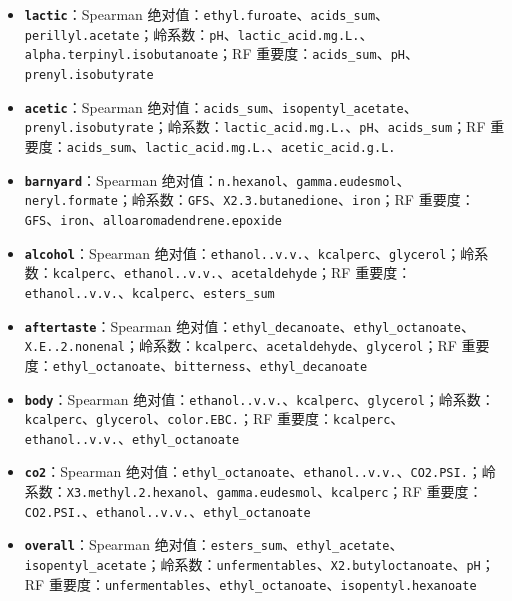\documentclass[
  11pt,
]{ctexart}
\newcounter{none} %
\begin{document}
\begin{itemize}
\item
  \textbf{\texttt{lactic}}：Spearman
  绝对值：\texttt{ethyl.furoate}、\texttt{acids\_sum}、\texttt{perillyl.\allowbreak{}acetate}；岭系数：\texttt{pH}、\texttt{lactic\_\allowbreak{}acid.\allowbreak{}mg.\allowbreak{}L.\allowbreak{}}、\texttt{alpha.\allowbreak{}terpinyl.\allowbreak{}isobutanoate}；RF
  重要度：\texttt{acids\_sum}、\texttt{pH}、\texttt{prenyl.\allowbreak{}isobutyrate}
\item
  \textbf{\texttt{acetic}}：Spearman
  绝对值：\texttt{acids\_sum}、\texttt{isopentyl\_\allowbreak{}acetate}、\texttt{prenyl.\allowbreak{}isobutyrate}；岭系数：\texttt{lactic\_\allowbreak{}acid.\allowbreak{}mg.\allowbreak{}L.\allowbreak{}}、\texttt{pH}、\texttt{acids\_sum}；RF
  重要度：\texttt{acids\_sum}、\texttt{lactic\_\allowbreak{}acid.\allowbreak{}mg.\allowbreak{}L.\allowbreak{}}、\texttt{acetic\_\allowbreak{}acid.\allowbreak{}g.\allowbreak{}L.\allowbreak{}}
\item
  \textbf{\texttt{barnyard}}：Spearman
  绝对值：\texttt{n.hexanol}、\texttt{gamma.\allowbreak{}eudesmol}、\texttt{neryl.formate}；岭系数：\texttt{GFS}、\texttt{X2.\allowbreak{}3.\allowbreak{}butanedione}、\texttt{iron}；RF
  重要度：\texttt{GFS}、\texttt{iron}、\texttt{alloaromadendrene.\allowbreak{}epoxide}
\item
  \textbf{\texttt{alcohol}}：Spearman
  绝对值：\texttt{ethanol..v.v.}、\texttt{kcalperc}、\texttt{glycerol}；岭系数：\texttt{kcalperc}、\texttt{ethanol..v.v.}、\texttt{acetaldehyde}；RF
  重要度：\texttt{ethanol..v.v.}、\texttt{kcalperc}、\texttt{esters\_sum}
\item
  \textbf{\texttt{aftertaste}}：Spearman
  绝对值：\texttt{ethyl\_\allowbreak{}decanoate}、\texttt{ethyl\_\allowbreak{}octanoate}、\texttt{X.\allowbreak{}E.\allowbreak{}.\allowbreak{}2.\allowbreak{}nonenal}；岭系数：\texttt{kcalperc}、\texttt{acetaldehyde}、\texttt{glycerol}；RF
  重要度：\texttt{ethyl\_\allowbreak{}octanoate}、\texttt{bitterness}、\texttt{ethyl\_\allowbreak{}decanoate}
\item
  \textbf{\texttt{body}}：Spearman
  绝对值：\texttt{ethanol..v.v.}、\texttt{kcalperc}、\texttt{glycerol}；岭系数：\texttt{kcalperc}、\texttt{glycerol}、\texttt{color.EBC.}；RF
  重要度：\texttt{kcalperc}、\texttt{ethanol..v.v.}、\texttt{ethyl\_\allowbreak{}octanoate}
\item
  \textbf{\texttt{co2}}：Spearman
  绝对值：\texttt{ethyl\_\allowbreak{}octanoate}、\texttt{ethanol..v.v.}、\texttt{CO2.PSI.}；岭系数：\texttt{X3.\allowbreak{}methyl.\allowbreak{}2.\allowbreak{}hexanol}、\texttt{gamma.\allowbreak{}eudesmol}、\texttt{kcalperc}；RF
  重要度：\texttt{CO2.PSI.}、\texttt{ethanol..v.v.}、\texttt{ethyl\_\allowbreak{}octanoate}
\item
  \textbf{\texttt{overall}}：Spearman
  绝对值：\texttt{esters\_sum}、\texttt{ethyl\_\allowbreak{}acetate}、\texttt{isopentyl\_\allowbreak{}acetate}；岭系数：\texttt{unfermentables}、\texttt{X2.\allowbreak{}butyloctanoate}、\texttt{pH}；RF
  重要度：\texttt{unfermentables}、\texttt{ethyl\_\allowbreak{}octanoate}、\texttt{isopentyl.\allowbreak{}hexanoate}
\end{itemize}
\end{document}
